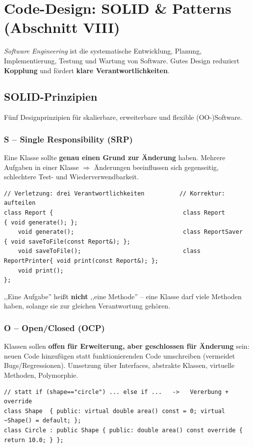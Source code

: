 \section{Code-Design: SOLID \& Patterns (Abschnitt VIII)}
\emph{Software Engineering} ist die systematische Entwicklung, Planung, Implementierung, Testung und Wartung von Software. Gutes Design reduziert \textbf{Kopplung} und f\"ordert \textbf{klare Verantwortlichkeiten}.

\subsection{SOLID-Prinzipien}
F\"unf Designprinzipien f\"ur skalierbare, erweiterbare und flexible (OO-)Software.

\subsubsection*{S -- Single Responsibility (SRP)}
Eine Klasse sollte \textbf{genau einen Grund zur \"Anderung} haben. Mehrere Aufgaben in einer Klasse $\Rightarrow$ \"Anderungen beeinflussen sich gegenseitig, schlechtere Test- und Wiederverwendbarkeit.
\begin{lstlisting}
// Verletzung: drei Verantwortlichkeiten          // Korrektur: aufteilen
class Report {                                     class Report       { void generate(); };
    void generate();                               class ReportSaver  { void saveToFile(const Report&); };
    void saveToFile();                             class ReportPrinter{ void print(const Report&); };
    void print();
};
\end{lstlisting}
\begin{merke}
,,Eine Aufgabe'' hei\ss t \textbf{nicht} ,,eine Methode'' -- eine Klasse darf viele Methoden haben, solange sie zur gleichen Verantwortung geh\"oren.
\end{merke}

\subsubsection*{O -- Open/Closed (OCP)}
Klassen sollen \textbf{offen f\"ur Erweiterung, aber geschlossen f\"ur \"Anderung} sein: neuen Code hinzuf\"ugen statt funktionierenden Code umschreiben (vermeidet Bugs/Regressionen). Umsetzung \"uber Interfaces, abstrakte Klassen, virtuelle Methoden, Polymorphie.
\begin{lstlisting}
// statt if (shape=="circle") ... else if ...   ->   Vererbung + override
class Shape  { public: virtual double area() const = 0; virtual ~Shape() = default; };
class Circle : public Shape { public: double area() const override { return 10.0; } };
\end{lstlisting}

